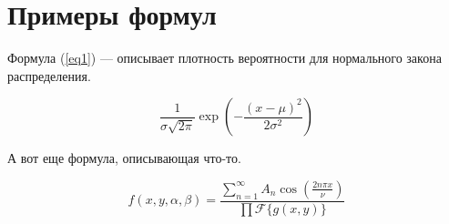 \chapter{Примеры формул}

Формула (\ref{eq1}) — описывает плотность вероятности для нормального закона распределения.

\begin{equation}
  \label{eq1}
  \frac{1}{\sigma\sqrt{2\pi}}\exp\left(-\frac{(x-\mu)^2}{2\sigma^2}\right)
\end{equation}

А вот еще формула, описывающая что-то.

\begin{equation}
f(x,y,\alpha, \beta) =
\frac{\sum \limits_{n=1}^{\infty} A_n \cos \left( \frac{2 n \pi x}{\nu} \right)}
{\prod \mathcal{F} \{g(x,y)\} }
\end{equation}